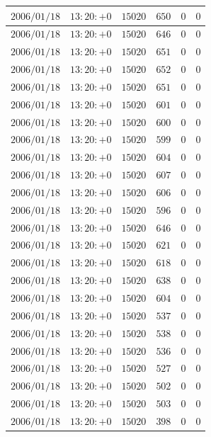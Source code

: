 \documentclass[a4j,papersize,disablejfam,slide,14pt]{jsarticle}
\begin{document}
\begin{description}
\begin{center}
\begin{longtable}{|l|l|l|l|l|l|}
					$2006/01/18$ & $13:20:+0$  & $15020$ & $650$ & $0$ & $0$ \\ \hline
					$2006/01/18$ & $13:20:+0$  & $15020$ & $646$ & $0$ & $0$ \\ \hline
					$2006/01/18$ & $13:20:+0$  & $15020$ & $651$ & $0$ & $0$ \\ \hline
					$2006/01/18$ & $13:20:+0$  & $15020$ & $652$ & $0$ & $0$ \\ \hline
					$2006/01/18$ & $13:20:+0$  & $15020$ & $651$ & $0$ & $0$ \\ \hline
					$2006/01/18$ & $13:20:+0$  & $15020$ & $601$ & $0$ & $0$ \\ \hline
					$2006/01/18$ & $13:20:+0$  & $15020$ & $600$ & $0$ & $0$ \\ \hline
					$2006/01/18$ & $13:20:+0$  & $15020$ & $599$ & $0$ & $0$ \\ \hline
					$2006/01/18$ & $13:20:+0$  & $15020$ & $604$ & $0$ & $0$ \\ \hline
					$2006/01/18$ & $13:20:+0$  & $15020$ & $607$ & $0$ & $0$ \\ \hline
					$2006/01/18$ & $13:20:+0$  & $15020$ & $606$ & $0$ & $0$ \\ \hline
					$2006/01/18$ & $13:20:+0$  & $15020$ & $596$ & $0$ & $0$ \\ \hline
					$2006/01/18$ & $13:20:+0$  & $15020$ & $646$ & $0$ & $0$ \\ \hline
					$2006/01/18$ & $13:20:+0$  & $15020$ & $621$ & $0$ & $0$ \\ \hline
					$2006/01/18$ & $13:20:+0$  & $15020$ & $618$ & $0$ & $0$ \\ \hline
					$2006/01/18$ & $13:20:+0$  & $15020$ & $638$ & $0$ & $0$ \\ \hline
					$2006/01/18$ & $13:20:+0$  & $15020$ & $604$ & $0$ & $0$ \\ \hline
					$2006/01/18$ & $13:20:+0$  & $15020$ & $537$ & $0$ & $0$ \\ \hline
					$2006/01/18$ & $13:20:+0$  & $15020$ & $538$ & $0$ & $0$ \\ \hline
					$2006/01/18$ & $13:20:+0$  & $15020$ & $536$ & $0$ & $0$ \\ \hline
					$2006/01/18$ & $13:20:+0$  & $15020$ & $527$ & $0$ & $0$ \\ \hline
					$2006/01/18$ & $13:20:+0$  & $15020$ & $502$ & $0$ & $0$ \\ \hline
					$2006/01/18$ & $13:20:+0$  & $15020$ & $503$ & $0$ & $0$ \\ \hline
					$2006/01/18$ & $13:20:+0$  & $15020$ & $398$ & $0$ & $0$ \\ \hline

\end{longtable}
\end{center}
\end{description}
\end{document}
